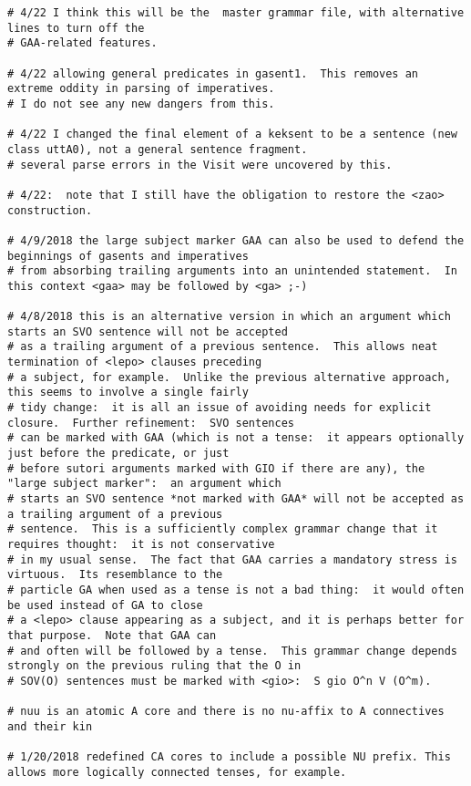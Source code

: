 \documentclass[12pt]{book}
\begin{document}
{\begin{verbatim}
# 4/22 I think this will be the  master grammar file, with alternative lines to turn off the 
# GAA-related features.

# 4/22 allowing general predicates in gasent1.  This removes an extreme oddity in parsing of imperatives.
# I do not see any new dangers from this.

# 4/22 I changed the final element of a keksent to be a sentence (new class uttA0), not a general sentence fragment.
# several parse errors in the Visit were uncovered by this.

# 4/22:  note that I still have the obligation to restore the <zao> construction.

# 4/9/2018 the large subject marker GAA can also be used to defend the beginnings of gasents and imperatives
# from absorbing trailing arguments into an unintended statement.  In this context <gaa> may be followed by <ga> ;-)

# 4/8/2018 this is an alternative version in which an argument which starts an SVO sentence will not be accepted
# as a trailing argument of a previous sentence.  This allows neat termination of <lepo> clauses preceding
# a subject, for example.  Unlike the previous alternative approach, this seems to involve a single fairly
# tidy change:  it is all an issue of avoiding needs for explicit closure.  Further refinement:  SVO sentences
# can be marked with GAA (which is not a tense:  it appears optionally just before the predicate, or just
# before sutori arguments marked with GIO if there are any), the "large subject marker":  an argument which 
# starts an SVO sentence *not marked with GAA* will not be accepted as a trailing argument of a previous
# sentence.  This is a sufficiently complex grammar change that it requires thought:  it is not conservative
# in my usual sense.  The fact that GAA carries a mandatory stress is virtuous.  Its resemblance to the 
# particle GA when used as a tense is not a bad thing:  it would often be used instead of GA to close
# a <lepo> clause appearing as a subject, and it is perhaps better for that purpose.  Note that GAA can
# and often will be followed by a tense.  This grammar change depends strongly on the previous ruling that the O in
# SOV(O) sentences must be marked with <gio>:  S gio O^n V (O^m).

# nuu is an atomic A core and there is no nu-affix to A connectives and their kin

# 1/20/2018 redefined CA cores to include a possible NU prefix. This allows more logically connected tenses, for example.


\end{verbatim}}
\end{document}
